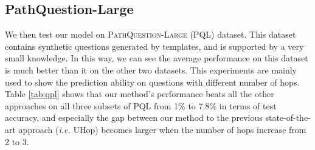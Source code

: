 \subsection{PathQuestion-Large}


\begin{table}[h]\centering
{}
\caption{\fontsize{10}{12}\selectfont We report set accuracy ($\%$) on PQL. Similar to Table \ref{tab:wqsp_cwq}, we use $*$ to highlight the methods which only requires the answer as supervision.}\label{tab:qpl}
\end{table}

We then test our model on \textsc{PathQuestion-Large} (PQL) dataset.
This dataset contains synthetic questions generated by templates, and is supported by a very small knowledge. In this way, we can see the average performance on this dataset is much better than it on the other two datasets. This experiments are mainly used to show the prediction ability on questions with different number of hops. Table \ref{tab:qpl} shows that our method's performance beats all the other approaches on all three subsets of PQL from 1$\%$ to 7.8$\%$ in terms of test accuracy, and especially the gap between our method to the previous state-of-the-art approach (\emph{i.e.} UHop) becomes larger when the number of hops increase from 2 to 3.  


